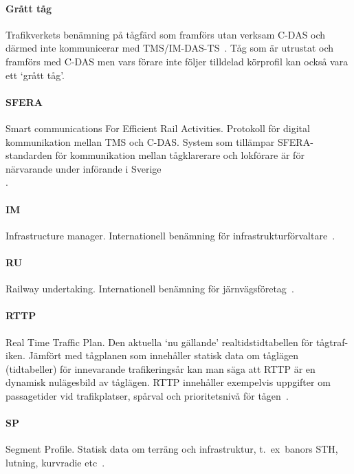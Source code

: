 \paragraph{Grått tåg}
Trafikverkets benämning på tågfärd som framförs utan verksam C-DAS och därmed inte kommunicerar med TMS/IM-DAS-TS~\cite{Joborn2023, Lindmark2022}.
Tåg som är utrustat och framförs med C-DAS men vars förare inte följer tilldelad körprofil kan också vara ett \lq{}grått tåg\rq{}.
\paragraph{SFERA}
Smart communications For Efficient Rail Activities.
Protokoll för digital kommunikation mellan TMS och C-DAS\@.
System som tillämpar SFERA-standarden för kommunikation mellan tågklarerare och lokförare är för närvarande under införande i Sverige\\\cite{Joborn2023}.
\paragraph{IM}
Infrastructure manager.
Internationell benämning för infrastrukturförvaltare~\cite{Olsson2023}.
\paragraph{RU}
Railway undertaking.
Internationell benämning för järnvägsföretag~\cite{Olsson2023}.
\paragraph{RTTP}
Real Time Traffic Plan.
Den aktuella \lq{}nu gällande\rq{} realtidstidtabellen för tågtraf-iken.
Jämfört med tågplanen som innehåller statisk data om tåglägen (tidtabeller) för innevarande trafikeringsår kan man säga att RTTP är en dynamisk nulägesbild av tåglägen.
RTTP innehåller exempelvis uppgifter om passagetider vid trafikplatser, spårval och prioritetsnivå för tågen~\cite{Joborn2023, Olsson2023}.
\paragraph{SP}
Segment Profile.
Statisk data om terräng och infrastruktur, t.~ex~banors STH, lutning, kurvradie etc~\cite{Olsson2023}.
